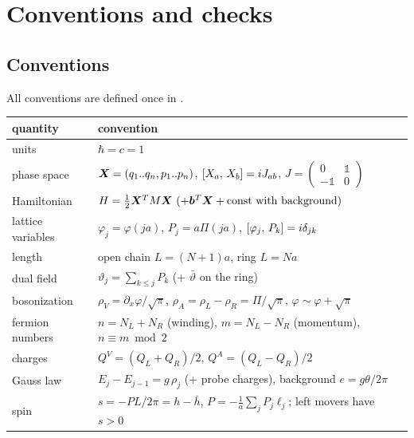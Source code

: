 \chapter{Conventions and checks}\label{app:conventions}

\section{Conventions}
All conventions are defined once in .
\begin{center}
\begin{tabular}{@{}ll@{}}
\toprule
quantity & convention \\
\midrule
units & $\hbar = c = 1$ \\
phase space & $\bm{X} = (q_1..q_n, p_1..p_n)$, $[X_a,\,X_b] = iJ_{ab}$, $J = \begin{pmatrix}0&\mathbb1\\-\mathbb1&0\end{pmatrix}$ \\
Hamiltonian & $H = \frac12\bm{X}^TM\bm{X}\ (+\bm{b}^T\bm{X} + \text{const with background})$ \\
lattice variables & $\varphi_j = \varphi(ja)$, $P_j = a\Pi(ja)$, $[\varphi_j,\,P_k] = i\delta_{jk}$ \\
length & open chain $L = (N+1)a$, ring $L = Na$ \\
dual field & $\vartheta_j = \sum_{k\leq j}P_k$ (+ $\bar\vartheta$ on the ring) \\
bosonization & $\rho_V = \partial_x\varphi/\sqrt\pi$, $\rho_A = \rho_L - \rho_R = \Pi/\sqrt\pi$, $\varphi\sim\varphi+\sqrt\pi$ \\
fermion numbers & $n = N_L + N_R$ (winding), $m = N_L - N_R$ (momentum), $n\equiv m \bmod 2$ \\
charges & $Q^V = (Q_L+Q_R)/2$, $Q^A = (Q_L-Q_R)/2$ \\
Gauss law & $E_j - E_{j-1} = g\,\rho_j$ (+ probe charges), background $e = g\theta/2\pi$ \\
spin & $s = -PL/2\pi = h - \bar h$, $P = -\frac1a\sum_jP_j\ell_j$; left movers have $s>0$ \\
\bottomrule
\end{tabular}
\end{center}

